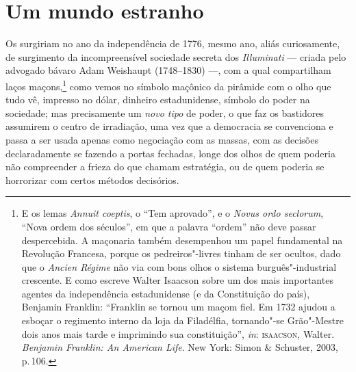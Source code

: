 \section{Um mundo estranho}

Os  surgiriam no ano da independência de 1776, mesmo ano, aliás
curiosamente, de surgimento da incompreensível sociedade secreta dos
\emph{Illuminati} --- criada pelo advogado bávaro Adam Weishaupt
(1748--1830) ---, com a qual compartilham laços maçons,\footnote{E os
  lemas \emph{Annuit coeptis}, o ``Tem aprovado'', e o \emph{Novus ordo
  seclorum}, ``Nova ordem dos séculos'', em que a palavra ``ordem'' não
  deve passar despercebida. A maçonaria também desempenhou um papel
  fundamental na Revolução Francesa, porque os pedreiros"-livres tinham
  de ser ocultos, dado que o \emph{Ancien Régime} não via com bons olhos
  o sistema burguês"-industrial crescente. E como escreve Walter Isaacson
  sobre um dos mais importantes agentes da independência estadunidense
  (e da Constituição do país), Benjamin Franklin: ``Franklin se tornou
  um maçom fiel. Em 1732 ajudou a esboçar o regimento interno da loja da
  Filadélfia, tornando"-se Grão"-Mestre dois anos mais tarde e imprimindo
  sua constituição'', \emph{in}: \textsc{isaacson}, Walter. \emph{Benjamin
  Franklin: An American Life}. New York: Simon \& Schuster, 2003, p.\,106.}
como vemos no símbolo maçônico da pirâmide com o olho que tudo vê,
impresso no dólar, dinheiro estadunidense, símbolo do poder na
sociedade; mas precisamente um \emph{novo tipo} de poder, o que faz os
bastidores assumirem o centro de irradiação, uma vez que a democracia se
convenciona e passa a ser usada apenas como negociação com as massas,
com as decisões declaradamente se fazendo a portas fechadas, longe dos
olhos de quem poderia não compreender a frieza do que chamam estratégia,
ou de quem poderia se horrorizar com certos métodos decisórios.

